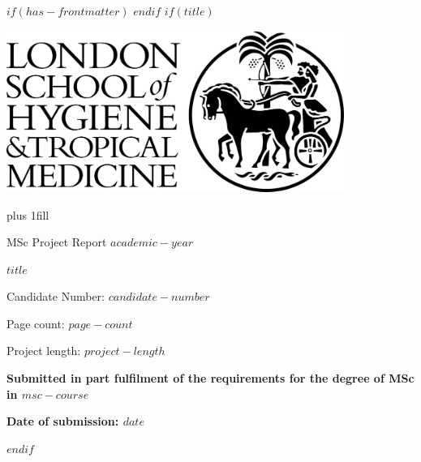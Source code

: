 $if(has-frontmatter)$
\frontmatter
$endif$
$if(title)$
\cleardoublepage
\thispagestyle{empty}
\begin{flushright}
\includegraphics[width=11cm]{img/lshtm_logo_small.jpg}
\end{flushright}
{\centering
\hbox{}\vskip 0cm plus 1fill
{\Large MSc Project Report $academic-year$ \par}
\vspace{6ex}
{\Huge\bfseries $title$ \par}
\vspace{6ex}
{\Large Candidate Number: $candidate-number$ \par}
\vspace{12ex}
{\small Page count:  $page-count$ \par}
\vspace{3ex}
{\small Project length: $project-length$ \par}
\vspace{6ex}
{\bfseries\large Submitted in part fulfilment of the requirements for the degree of MSc in $msc-course$ \par}
\vspace{3ex}
{\bfseries\large Date of submission:  $date$ \par}
\vspace{12ex}
}
$endif$
